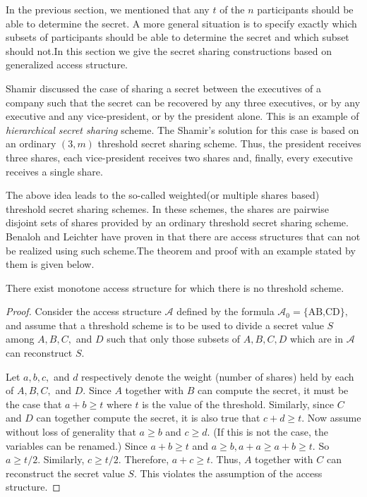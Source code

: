 \documentclass{llncs}
\begin{document}
In the previous section, we mentioned that any  $t$ of the $n$ participants should be able to determine the secret. A more general situation is to specify exactly which subsets of participants should be able to determine the secret and which subset should not.In this section we give the secret sharing constructions based on generalized access structure.

Shamir \cite{shamir1979} discussed the case of sharing a secret between the executives of a company such that the secret can be recovered by any three executives, or by any executive and any vice-president, or by the president alone. This is an example of  \textit{hierarchical secret sharing} scheme. The Shamir’s solution for this case is based on an ordinary $(3,m)$ threshold secret sharing scheme. Thus, the president receives three shares, each vice-president receives two shares and, finally, every  executive receives a single share.

The above idea leads to the so-called weighted(or multiple shares based) threshold secret sharing schemes. In these schemes, the shares are pairwise disjoint sets of shares provided by an ordinary threshold secret sharing scheme. Benaloh and Leichter have proven in \cite{benaloh1990generalized} that there are access structures that can not be realized using such scheme.The theorem and proof with an example stated by them is given below.
 \begin{theorem}
There exist monotone access structure for which there is no threshold scheme.
\end{theorem}
\begin{proof}
Consider the access structure $\mathcal{A}$ defined by the formula $\mathcal{A}_0 = \mbox{\{AB,CD\},}$ and assume that a threshold scheme is to be used to divide a secret value $S$ among $A, B, C,$ and $D$ such that only those subsets of ${A,B,C,D}$ which are in $\mathcal{A}$ can reconstruct $S.$
               
Let $a, b, c,$ and $d$ respectively denote the weight (number of shares) held by each of $A, B, C,$ and $D.$ Since $A$ together with $B$ can compute the secret, it must be the case that $a + b \geq t$ where $t$ is the value of the threshold. Similarly, since $C$ and $D$ can together compute the secret, it is also true that $c + d \geq t.$
 Now assume without loss of generality that $a \geq b$ and $c \geq d.$ (If this is not the case, the variables can be renamed.) Since $a + b \geq t$ and $a \geq b, a + a \geq a + b \geq t.$ So $a \geq t/2.$ Similarly, $c \geq t/2.$ Therefore, $a + c \geq t.$
 Thus, $A$ together with $C$ can reconstruct the secret value $S$. This violates the assumption of the access structure.
\end{proof}
\end{document}
